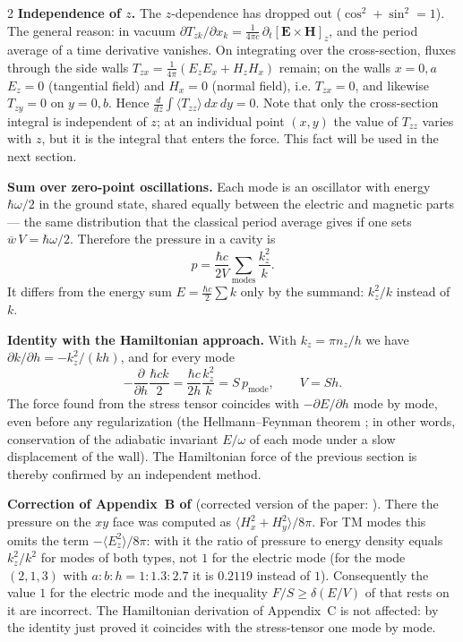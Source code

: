 \documentclass[twoside, 10pt]{article}
\begin{document}
\begin{multicols}{2}
\textbf{Independence of \(z\).} The \(z\)-dependence has dropped out (\(\cos^2+\sin^2=1\)). The
general reason: in vacuum \(\partial T_{zk}/\partial x_k=\frac1{4\pi c}\,\partial_t[\mathbf E\times\mathbf H]_z\),
and the period average of a time derivative vanishes. On integrating over the cross-section, fluxes
through the side walls \(T_{zx}=\frac1{4\pi}(E_zE_x+H_zH_x)\) remain; on the walls \(x=0,a\)
\(E_z=0\) (tangential field) and \(H_x=0\) (normal field), i.e. \(T_{zx}=0\), and likewise
\(T_{zy}=0\) on \(y=0,b\). Hence \(\frac{d}{dz}\int\langle T_{zz}\rangle\,dx\,dy=0\). Note that only
the cross-section integral is independent of \(z\); at an individual point \((x,y)\) the value of
\(T_{zz}\) varies with \(z\), but it is the integral that enters the force. This fact will be used
in the next section.

\textbf{Sum over zero-point oscillations.} Each mode is an oscillator with energy \(\hbar\omega/2\)
in the ground state, shared equally between the electric and magnetic parts --- the same
distribution that the classical period average gives if one sets \(\overline w\,V=\hbar\omega/2\).
Therefore the pressure in a cavity is
\[
p=\frac{\hbar c}{2V}\sum_{\text{modes}}\frac{k_z^2}{k}.
\]
It differs from the energy sum \(E=\frac{\hbar c}{2}\sum k\) only by the summand: \(k_z^2/k\)
instead of \(k\).

\textbf{Identity with the Hamiltonian approach.} With \(k_z=\pi n_z/h\) we have
\(\partial k/\partial h=-k_z^2/(kh)\), and for every mode
\[
-\frac{\partial}{\partial h}\frac{\hbar ck}{2}=\frac{\hbar c}{2h}\frac{k_z^2}{k}=S\,p_{\text{mode}},\qquad V=Sh .
\]
The force found from the stress tensor coincides with \(-\partial E/\partial h\) mode by mode, even
before any regularization (the Hellmann--Feynman theorem \cite{Feynman1939}; in other words,
conservation of the adiabatic invariant \(E/\omega\) of each mode under a slow displacement of the
wall). The Hamiltonian force of the previous section is thereby confirmed by an independent method.

\textbf{Correction of Appendix~B of \cite{Drozdov2024}} (corrected version of the paper: \cite{Drozdov2024fix}). There the pressure on the \(xy\) face was
computed as \(\langle H_x^2+H_y^2\rangle/8\pi\). For TM modes this omits the term
\(-\langle E_z^2\rangle/8\pi\): with it the ratio of pressure to energy density equals
\(k_z^2/k^2\) for modes of both types, not \(1\) for the electric mode (for the mode \((2,1,3)\)
with \(a:b:h=1:1.3:2.7\) it is \(0.2119\) instead of \(1\)). Consequently the value \(1\) for the
electric mode and the inequality \(F/S\ge\delta(E/V)\) of \cite{Drozdov2024} that rests on it are
incorrect. The Hamiltonian derivation of Appendix~C is not affected: by the identity just proved it
coincides with the stress-tensor one mode by mode.


\end{multicols}
\end{document}
